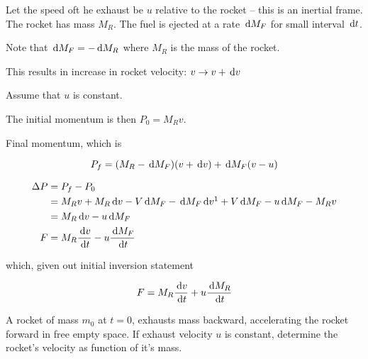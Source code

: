 \begin{example}
	Let the speed oft he exhaust be $u$ relative to the rocket -- this is an inertial frame. The rocket has mass $M_R$. The fuel is ejected at a rate $\D M_F$ for small interval $\D t$.
\end{example}

\begin{sol}
	Note that $\D M_F = - \D M_R$ where $M_R$ is the mass of the rocket.

	This results in increase in rocket velocity: $v \rightarrow v + \D v$

	Assume that $u$ is constant.

	The initial momentum is then $P_0 = M_R v$.

	Final momentum, which is 

	\begin{equation}
		P_f = (M_R - \D M_F) (v + \D v) + \D M_F (v - u)
	\end{equation}

	\begin{align}
		\Delta P &= P_f - P_0\\
		&= M_R v + M_R \D v - V \D M_F - \D M_F \D v\footnotemark + V \D M_F - u \D M_F - M_R v\\
		&= M_R \D v - u \D M_F\\
		F &= M_R \frac{\D v}{\D t} - u \frac{\D M_F}{\D t}\\
	\end{align}


	which, given out initial inversion statement

	\begin{equation}
		F = M_R \frac{\D v}{\D t} + u \frac{\D M_R}{\D t}
	\end{equation}
\end{sol}

\begin{example}
	A rocket of mass $m_0$ at $t = 0$, exhausts mass backward, accelerating the rocket forward in free empty space. If exhaust velocity $u$ is constant, determine the rocket's velocity as function of it's mass.
\end{example}

